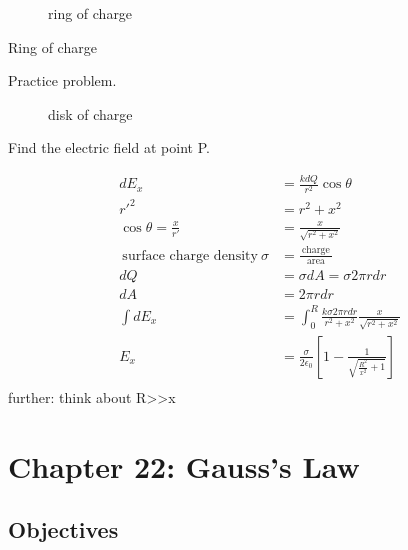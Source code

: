 \begin{figure}[ht]
	\centering
	\caption{ring of charge}
	\label{fig:ring-of-charge}
\end{figure}
\begin{example}[4]
	Ring of charge
\end{example}

\begin{solution}[4]
	Practice problem.
\end{solution}

\begin{figure}[ht]
	\centering
	\caption{disk of charge}
	\label{fig:disk-of-charge}
\end{figure}

\begin{example}

	Find the electric field at point P.
\end{example}

\begin{solution}
	\begin{align*}
		dE_{x}&=  \frac{kdQ}{r^2} \cos \theta \\
		r'^2 &= r^2 + x^2 \\
		\cos \theta = \frac{x}{r'} &= \frac{x}{\sqrt{r^2  + x^2} } \\
		\:\text{surface charge density}\: \sigma &=\frac{\:\text{charge}\:}{\:\text{area}\:} \\
		dQ &= \sigma dA = \sigma 2\pi r dr \\
		dA &= 2\pi r dr \\
		\int d E_{x} &= \int_{0}^{R} \frac{k \sigma 2 \pi r dr}{r^2 + x ^2} \frac{x}{\sqrt{r^2 + x^2} }  \\
		E_{x}&= \frac{\sigma}{2 \epsilon_{0}}\left[ 1 - \frac{1}{\sqrt{\frac{R^2}{x^2}+1} } \right]  \\
	\end{align*}
	further: think about R>>x
\end{solution}

\break
\section{Chapter 22: Gauss's Law}%
\label{sec:chapter_22_gauss_s_law}

\subsection{Objectives}%
\label{sub:objectives}

